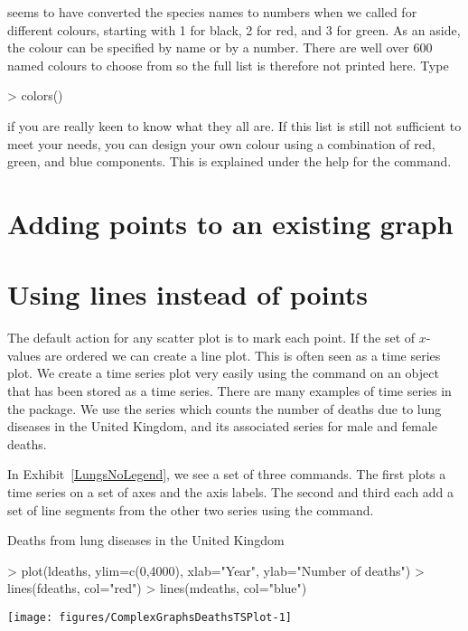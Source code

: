 \R{} seems to have converted the species names to numbers when we called for different colours, starting with 1 for black, 2 for red, and 3 for green. As an aside, the colour can be specified by name or by a number. There are well over 600 named colours to choose from so the full list is therefore not printed here. Type 

\begin{Schunk}
\begin{Sinput}
> colors() 
\end{Sinput}
\end{Schunk}

if you are really keen to know what they all are. If this list is still not sufficient to meet your needs, you can design your own colour using a combination of red, green, and blue components. This is explained under the help for the  command. 
 
\section{Adding points to an existing graph} 
 
\section{Using lines instead of points} \label{LinesInsteadOfPoints}  
 
The default action for any scatter plot is to mark each point. If the set of $x$-values are ordered we can create a line plot. This is often seen as a time series plot. We create a time series plot very easily using the  command on an object that has been stored as a time series. There are many examples of time series in the  package. We use the  series which counts the number of deaths due to lung diseases in the United Kingdom, and its associated series for male and female deaths. 
 
In Exhibit~\ref{LungsNoLegend}, we see a set of three commands. The first plots a time series on a set of axes and the axis labels. The second and third each add a set of line segments from the other two series using the  command. 
 
\begin{exhibit} 
\begin{center} 
\caption{Deaths from lung diseases in the United Kingdom} 
\label{LungsNoLegend} 

\begin{Schunk}
\begin{Sinput}
> plot(ldeaths, ylim=c(0,4000), xlab="Year", ylab="Number of deaths") 
> lines(fdeaths, col="red") 
> lines(mdeaths, col="blue") 
\end{Sinput}

\texttt{[image: figures/ComplexGraphsDeathsTSPlot-1]} \end{Schunk}

\end{center} 
\end{exhibit} 
 
